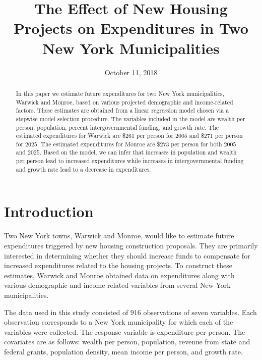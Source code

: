 \documentclass{article}\usepackage[]{graphicx}\usepackage[]{color}
\title{The Effect of New Housing Projects on Expenditures in Two New York Municipalities}
\date{October 11, 2018}
\begin{document}
 
\maketitle

\begin{abstract}
In this paper we estimate future expenditures for two New York municipalities, Warwick and Monroe, based on various projected demographic and income-related factors. These estimates are obtained from a linear regression model chosen via a stepwise model selection procedure. The variables included in the model are wealth per person, population, percent intergovernmental funding, and growth rate. The estimated expenditures for Warwick are \$$261$ per person for $2005$ and \$$271$ per person for $2025$. The estimated expenditures for Monroe are \$$273$ per person for both $2005$ and $2025$. Based on the model, we can infer that increases in population and wealth per person lead to increased expenditures while increases in intergovernmental funding and growth rate lead to a decrease in expenditures.
\end{abstract}


\section{Introduction} \label{intro}

Two New York towns, Warwick and Monroe, would like to estimate future expenditures triggered by new housing construction proposals. They are primarily interested in determining whether they should increase funds to compensate for increased expenditures related to the housing projects. To construct these estimates, Warwick and Monroe obtained data on expenditures along with various demographic and income-related variables from several New York municipalities. 


The data used in this study consisted of 916 observations of seven variables. Each observation corresponds to a New York municipality for which each of the variables were collected. The response variable is expenditure per person. The covariates are as follows: wealth per person, population, revenue from state and federal grants, population density, mean income per person, and growth rate.
\end{document}
